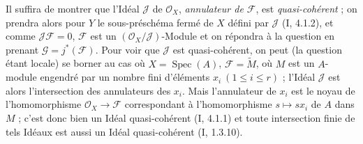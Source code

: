 Il suffira de montrer que l'Idéal $\mathscr J$ de $\mathscr O_X$,
\emph{annulateur de $\mathscr F$}, est \emph{quasi-cohérent} ; on prendra alors
pour $Y$ le sous-préschéma fermé de $X$ défini par $\mathscr J$ (I, 4.1.2), et
comme $\mathscr J\mathscr F=0$, $\mathscr F$ est un
$(\mathscr O_X/\mathscr J)$-Module et on répondra à la question en prenant
$\mathscr G=j^*(\mathscr F)$. Pour voir que $\mathscr J$ est quasi-cohérent, on
peut (la question étant locale) se borner au cas où
$X=\operatorname{Spec}(A)$, $\mathscr F=\widetilde M$, où $M$ est un $A$-module
engendré par un nombre fini d'éléments $x_i\ (1\leq i\leq r)$ ; l'Idéal
$\mathscr J$ est alors l'intersection des annulateurs des $x_i$. Mais
l'annulateur de $x_i$ est le noyau de l'homomorphisme
$\mathscr O_X\to\mathscr F$ correspondant à l'homomorphisme $s\mapsto sx_i$ de
$A$ dans $M$ ; c'est donc bien un Idéal quasi-cohérent (I, 4.1.1) et toute
intersection finie de tels Idéaux est aussi un Idéal quasi-cohérent (I,
1.3.10).
